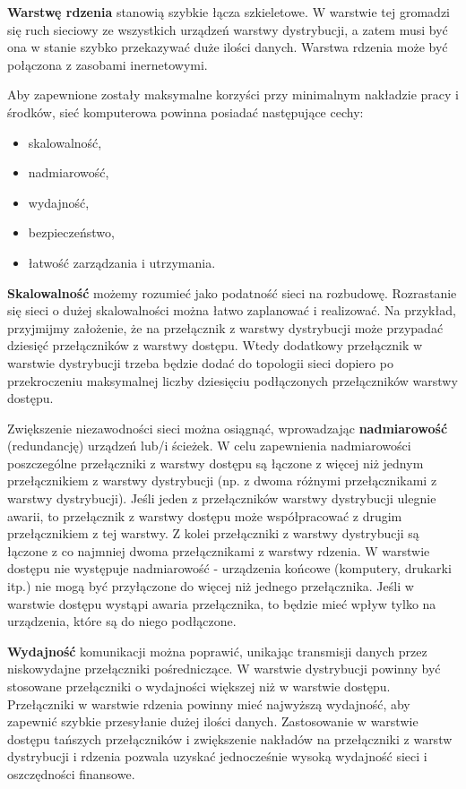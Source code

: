 \textbf{Warstwę rdzenia} stanowią szybkie łącza szkieletowe. W warstwie tej gromadzi się ruch sieciowy ze wszystkich urządzeń warstwy dystrybucji, a zatem musi być ona w stanie szybko przekazywać duże ilości danych. Warstwa rdzenia może być połączona z zasobami inernetowymi.

Aby zapewnione zostały maksymalne korzyści przy minimalnym nakładzie pracy i środków, sieć komputerowa powinna posiadać następujące cechy:

\begin{itemize}
	\setlength\itemsep{1pt}
	\item skalowalność,
	\item nadmiarowość,
	\item wydajność,
	\item bezpieczeństwo,
	\item łatwość zarządzania i utrzymania.
\end{itemize}

\textbf{Skalowalność} możemy rozumieć jako podatność sieci na rozbudowę. Rozrastanie się sieci o dużej skalowalności można łatwo zaplanować i realizować. Na przykład, przyjmijmy założenie, że na przełącznik z warstwy dystrybucji może przypadać dziesięć przełączników z warstwy dostępu. Wtedy dodatkowy przełącznik w warstwie dystrybucji trzeba będzie dodać do topologii sieci dopiero po przekroczeniu maksymalnej liczby dziesięciu podłączonych przełączników warstwy dostępu.

Zwiększenie niezawodności sieci można osiągnąć, wprowadzając \textbf{nadmiarowość} (redundancję) urządzeń lub/i ścieżek. W celu zapewnienia nadmiarowości poszczególne przełączniki z warstwy dostępu są łączone z więcej niż jednym przełącznikiem z warstwy dystrybucji (np. z dwoma różnymi przełącznikami z warstwy dystrybucji). Jeśli jeden z przełączników warstwy dystrybucji ulegnie awarii, to przełącznik z warstwy dostępu może współpracować z drugim przełącznikiem z tej warstwy. Z kolei przełączniki z warstwy dystrybucji są łączone z co najmniej dwoma przełącznikami z warstwy rdzenia. W warstwie dostępu nie występuje nadmiarowość - urządzenia końcowe (komputery, drukarki itp.) nie mogą być przyłączone do więcej niż jednego przełącznika. Jeśli w warstwie dostępu wystąpi awaria przełącznika, to będzie mieć wpływ tylko na urządzenia, które są do niego podłączone.

\textbf{Wydajność} komunikacji można poprawić, unikając transmisji danych przez niskowydajne przełączniki pośredniczące. W warstwie dystrybucji powinny być stosowane przełączniki o wydajności większej niż w warstwie dostępu. Przełączniki w warstwie rdzenia powinny mieć najwyższą wydajność, aby zapewnić szybkie przesyłanie dużej ilości danych. Zastosowanie w warstwie dostępu tańszych przełączników i zwiększenie nakładów na przełączniki z warstw dystrybucji i rdzenia pozwala uzyskać jednocześnie wysoką wydajność sieci i oszczędności finansowe.

